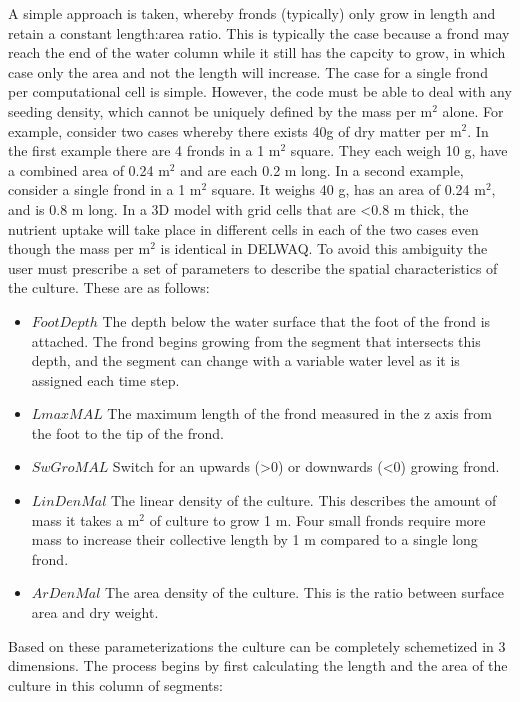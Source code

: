 \documentclass{deltares_manual}
\begin{document}
A simple approach is taken, whereby fronds (typically) only grow in length and retain a constant length:area ratio. This is typically the case because a frond may reach the end of the water column while it still has the capcity to grow, in which case only the area and not the length will increase. The case for a single frond per computational cell is simple. However, the code must be able to deal with any seeding density, which cannot be uniquely defined by the mass per m$^{2}$ alone. For example, consider two cases whereby there exists 40g of dry matter per m$^{2}$. In the first example there are 4 fronds in a 1 m$^{2}$ square. They each weigh 10 g, have a combined area of 0.24 m$^{2}$ and are each 0.2 m long. In a second example, consider a single frond in a 1 m$^{2}$ square. It weighs 40 g, has an area of 0.24 m$^{2}$, and is 0.8 m long. In a 3D model with grid cells that are \textless 0.8 m thick, the nutrient uptake will take place in different cells in each of the two cases even though the mass per m$^{2}$ is identical in DELWAQ. To avoid this ambiguity the user must prescribe a set of parameters to describe the spatial characteristics of the culture. These are as follows:

\begin{itemize}
\item $FootDepth$ The depth below the water surface that the foot of the frond is attached. The frond begins growing from the segment that intersects this depth, and the segment can change with a variable water level as it is assigned each time step.
\item $LmaxMAL$ The maximum length of the frond measured in the z axis from the foot to the tip of the frond.
\item $SwGroMAL$ Switch for an upwards (\textgreater 0) or downwards (\textless 0) growing frond.
\item $LinDenMal$ The linear density of the culture. This describes the amount of mass it takes a m$^{2}$ of culture to grow 1 m. Four small fronds require more mass to increase their collective length by 1 m compared to a single long frond.
\item $ArDenMal$ The area density of the culture. This is the ratio between surface area and dry weight.
\end{itemize}

Based on these parameterizations the culture can be completely schemetized in 3 dimensions. The process begins by first calculating the length and the area of the culture in this column of segments:
\end{document}
